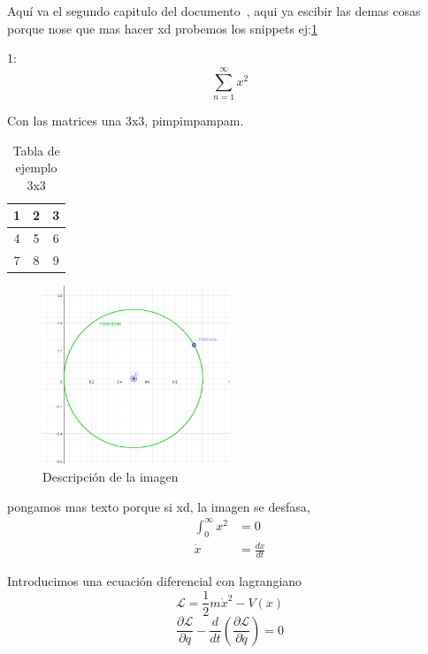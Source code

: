 Aquí va el segundo capitulo del documento~\cite{martin1988estudio}, aqui ya escibir las demas cosas porque nose que mas hacer xd 
probemos los snippets ej:\ref{tab:ejemplo_3x3} 

1:
\begin{equation}
    \sum_{n = 1}^{\infty} x^2 
\end{equation}


Con las matrices una 3x3, pimpimpampam.
\begin{table}[ht]
\centering
\begin{tabular}{|c|c|c|}
\hline
1 & 2 & 3 \\ \hline
4 & 5 & 6 \\ \hline
7 & 8 & 9 \\ \hline
\end{tabular}
\caption{Tabla de ejemplo 3x3}
\label{tab:ejemplo_3x3}
\end{table}

\begin{figure}[H]
\centering
\includegraphics[width=0.5\textwidth]{Imagenes/Captura de pantalla 2024-11-29 113246.png}
\caption{Descripción de la imagen}
\label{fig:ejemplo_imagen}
\end{figure}

pongamos mas texto porque si xd, la imagen se desfasa, 
\begin{align*}
\int_{0}^{\infty} x^2 & = 0\\
\dot{x} & =\frac{dx}{dt} 
\end{align*}

Introducimos una ecuación diferencial con lagrangiano
\begin{equation}
\mathcal{L} = \frac{1}{2} m \dot{x}^2 - V(x)
\end{equation}
\begin{equation}
    \frac{\partial \mathcal{L}}{\partial q} - \frac{d}{dt} \left( \frac{\partial \mathcal{L}}{\partial \dot{q}} \right) = 0
\end{equation}


